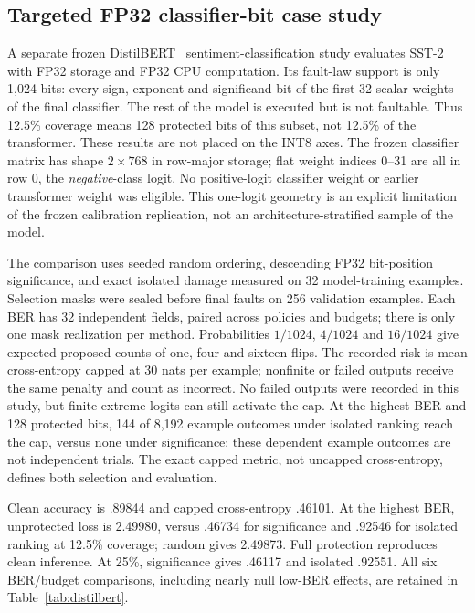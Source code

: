 \subsection{Targeted FP32 classifier-bit case study}
\label{sec:distilbert}
A separate frozen DistilBERT~\cite{sanh2019distilbert} sentiment-classification study evaluates SST-2~\cite{socher2013sst}
with FP32 storage and FP32 CPU computation. Its fault-law support is only
1,024 bits: every sign, exponent and significand bit of the first 32 scalar
weights of the final classifier. The rest of the model is executed but is not
faultable. Thus 12.5\% coverage means 128 protected bits of this subset, not
12.5\% of the transformer. These results are not placed on the INT8 axes.
The frozen classifier matrix has shape $2\times768$ in row-major storage;
flat weight indices 0--31 are all in row 0, the \emph{negative}-class logit.
No positive-logit classifier weight or earlier transformer weight was eligible.
This one-logit geometry is an explicit limitation of the frozen calibration
replication, not an architecture-stratified sample of the model.

The comparison uses seeded random ordering, descending FP32 bit-position
significance, and exact isolated damage measured on 32 model-training examples.
Selection masks were sealed before final faults on 256 validation examples.
Each BER has 32 independent fields, paired across policies and budgets;
there is only one mask realization per method. Probabilities $1/1024$, $4/1024$
and $16/1024$ give expected proposed counts of one, four and sixteen flips.
The recorded risk is mean cross-entropy capped at 30 nats per example;
nonfinite or failed outputs receive the same penalty and count as incorrect.
No failed outputs were recorded in this study, but finite extreme logits can
still activate the cap. At the highest BER and 128 protected bits, 144 of 8,192
example outcomes under isolated ranking reach the cap, versus none under
significance; these dependent example outcomes are not independent trials.
The exact capped metric, not uncapped cross-entropy,
defines both selection and evaluation.

Clean accuracy is .89844 and capped cross-entropy .46101. At the highest BER,
unprotected loss is 2.49980, versus .46734 for significance and .92546 for
isolated ranking at 12.5\% coverage; random gives 2.49873. Full protection
reproduces clean inference. At 25\%, significance gives .46117 and isolated
.92551. All six BER/budget comparisons, including nearly null low-BER effects,
are retained in Table~\ref{tab:distilbert}.

